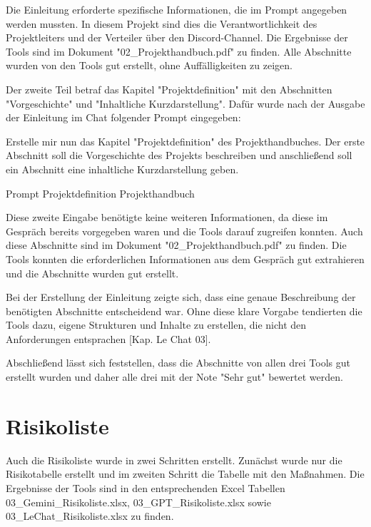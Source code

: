 Die Einleitung erforderte spezifische Informationen, die im Prompt angegeben werden mussten. In diesem Projekt sind 
dies die Verantwortlichkeit des Projektleiters und der Verteiler über den Discord-Channel. Die Ergebnisse der Tools 
sind im Dokument "02\_Projekthandbuch.pdf" zu finden. Alle Abschnitte wurden von den Tools gut erstellt, ohne 
Auffälligkeiten zu zeigen.

Der zweite Teil betraf das Kapitel "Projektdefinition" mit den Abschnitten "Vorgeschichte" und "Inhaltliche Kurzdarstellung". 
Dafür wurde nach der Ausgabe der Einleitung im Chat folgender Prompt eingegeben:

\begin{prompt}[H]
    \begin{tcolorbox}[colback=gray!20, colframe=gray!20, boxrule=0pt, sharp corners]
        Erstelle mir nun das Kapitel "Projektdefinition" des Projekthandbuches. Der erste Abschnitt soll die 
        Vorgeschichte des Projekts beschreiben und anschließend soll ein Abschnitt eine inhaltliche Kurzdarstellung 
        geben.
        \vfill
    \end{tcolorbox}
    \caption{Prompt Projektdefinition Projekthandbuch}
    \label{Prompt Projektdefinition Projekthandbuch}
\end{prompt}

Diese zweite Eingabe benötigte keine weiteren Informationen, da diese im Gespräch bereits vorgegeben waren und die 
Tools darauf zugreifen konnten. Auch diese Abschnitte sind im Dokument "02\_Projekthandbuch.pdf" zu finden. Die Tools 
konnten die erforderlichen Informationen aus dem Gespräch gut extrahieren und die Abschnitte wurden gut erstellt.

Bei der Erstellung der Einleitung zeigte sich, dass eine genaue Beschreibung der benötigten Abschnitte entscheidend war. 
Ohne diese klare Vorgabe tendierten die Tools dazu, eigene Strukturen und Inhalte zu erstellen, die nicht den 
Anforderungen entsprachen [Kap. Le Chat 03].

Abschließend lässt sich feststellen, dass die Abschnitte von allen drei Tools gut erstellt wurden und daher alle drei 
mit der Note "Sehr gut" bewertet werden.

\section{Risikoliste}  \label{CompRisikoliste}

Auch die Risikoliste wurde in zwei Schritten erstellt. Zunächst wurde nur die Risikotabelle erstellt und im zweiten 
Schritt die Tabelle mit den Maßnahmen. Die Ergebnisse der Tools sind in den entsprechenden Excel Tabellen 
03\_Gemini\_Risikoliste.xlsx, 03\_GPT\_Risikoliste.xlsx sowie 03\_LeChat\_Risikoliste.xlsx zu finden.

